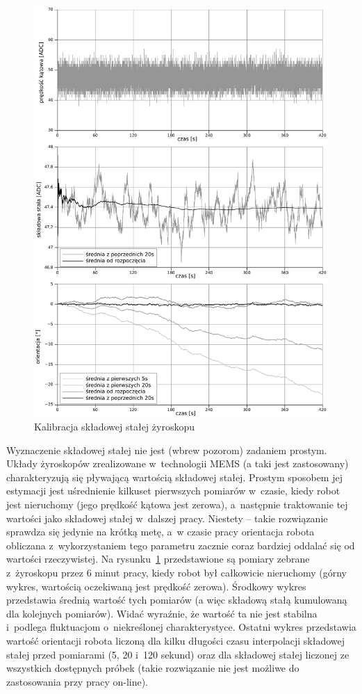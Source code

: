 \begin{figure}[htp!]
\centering
\includegraphics[width=15.5cm]{../../Common/pomiary/gyro_bias_bw}
\caption{Kalibracja składowej stałej żyroskopu}
\label{fig:gyro_bias}
\end{figure}

Wyznaczenie składowej stałej nie jest (wbrew pozorom) zadaniem prostym. Układy
żyroskopów zrealizowane w~technologii MEMS (a taki jest zastosowany)
charakteryzują się pływającą wartością składowej stałej. Prostym sposobem jej
estymacji jest uśrednienie kilkuset pierwszych pomiarów w~czasie, kiedy
robot jest nieruchomy (jego prędkość kątowa jest zerowa), a~następnie
traktowanie tej wartości jako składowej stałej w~dalszej pracy. Niestety --
takie rozwiązanie sprawdza się jedynie na krótką metę, a~w czasie pracy
orientacja robota obliczana z~wykorzystaniem tego parametru zacznie coraz
bardziej oddalać się od wartości rzeczywistej. Na rysunku~\ref{fig:gyro_bias}
przedstawione są pomiary zebrane z~żyroskopu przez 6 minut pracy, kiedy robot
był całkowicie nieruchomy (górny wykres, wartością oczekiwaną jest prędkość
zerowa). Środkowy wykres przedstawia średnią wartość tych pomiarów (a więc
składową stałą kumulowaną dla kolejnych pomiarów). Widać wyraźnie, że wartość ta
nie jest stabilna i~podlega fluktuacjom o~niekreślonej charakterystyce. Ostatni
wykres przedstawia wartość orientacji robota liczoną dla kilku długości czasu
interpolacji składowej stałej przed pomiarami (5, 20 i~120 sekund) oraz dla
składowej stałej liczonej ze wszystkich dostępnych próbek (takie rozwiązanie
nie jest możliwe do zastosowania przy pracy on-line).

